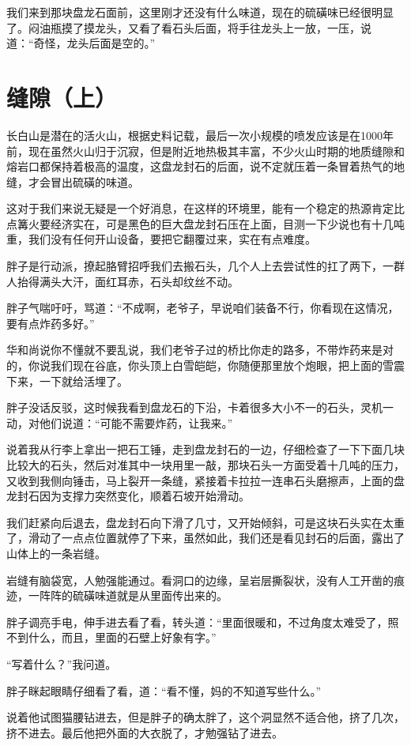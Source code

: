 我们来到那块盘龙石面前，这里刚才还没有什么味道，现在的硫磺味已经很明显了。闷油瓶摸了摸龙头，又看了看石头后面，将手往龙头上一放，一压，说道：“奇怪，龙头后面是空的。”

\chapter{缝隙（上）}

长白山是潜在的活火山，根据史料记载，最后一次小规模的喷发应该是在1000年前，现在虽然火山归于沉寂，但是附近地热极其丰富，不少火山时期的地质缝隙和熔岩口都保持着极高的温度，这盘龙封石的后面，说不定就压着一条冒着热气的地缝，才会冒出硫磺的味道。

这对于我们来说无疑是一个好消息，在这样的环境里，能有一个稳定的热源肯定比点篝火要经济实在，可是黑色的巨大盘龙封石压在上面，目测一下少说也有十几吨重，我们没有任何开山设备，要把它翻覆过来，实在有点难度。

胖子是行动派，撩起胳臂招呼我们去搬石头，几个人上去尝试性的扛了两下，一群人抬得满头大汗，面红耳赤，石头却纹丝不动。

胖子气喘吁吁，骂道：“不成啊，老爷子，早说咱们装备不行，你看现在这情况，要有点炸药多好。”

华和尚说你不懂就不要乱说，我们老爷子过的桥比你走的路多，不带炸药来是对的，你说我们现在谷底，你头顶上白雪皑皑，你随便那里放个炮眼，把上面的雪震下来，一下就给活埋了。

胖子没话反驳，这时候我看到盘龙石的下沿，卡着很多大小不一的石头，灵机一动，对他们说道：“可能不需要炸药，让我来。”

说着我从行李上拿出一把石工锤，走到盘龙封石的一边，仔细检查了一下下面几块比较大的石头，然后对准其中一块用里一敲，那块石头一方面受着十几吨的压力，又收到我侧向锤击，马上裂开一条缝，紧接着卡拉拉一连串石头磨擦声，上面的盘龙封石因为支撑力突然变化，顺着石坡开始滑动。

我们赶紧向后退去，盘龙封石向下滑了几寸，又开始倾斜，可是这块石头实在太重了，滑动了一点点位置就停了下来，虽然如此，我们还是看见封石的后面，露出了山体上的一条岩缝。

岩缝有脑袋宽，人勉强能通过。看洞口的边缘，呈岩层撕裂状，没有人工开凿的痕迹，一阵阵的硫磺味道就是从里面传出来的。

胖子调亮手电，伸手进去看了看，转头道：“里面很暖和，不过角度太难受了，照不到什么，而且，里面的石壁上好象有字。”

“写着什么？”我问道。

胖子眯起眼睛仔细看了看，道：“看不懂，妈的不知道写些什么。”

说着他试图猫腰钻进去，但是胖子的确太胖了，这个洞显然不适合他，挤了几次，挤不进去。最后他把外面的大衣脱了，才勉强钻了进去。

